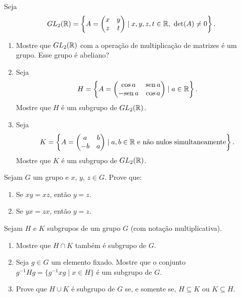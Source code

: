 \documentclass[12pt]{article}
\begin{document}
\questao{} Seja
\[
	GL_2(\mathbb{R}) = \left\{A = \begin{pmatrix}
		x & y\\z & t
	\end{pmatrix} \mid x, y, z, t \in \mathbb{R},\ \det(A) \ne 0\right\}.
\]
\begin{enumerate}[label=({\alph*})]
	\item Mostre que $GL_2(\mathbb{R})$ com a opera\c{c}\~ao de multiplica\c{c}\~ao de matrizes \'e um grupo. Esse grupo \'e abeliano?
	\item Seja
	\[
		H = \left\{ A = \begin{pmatrix}
			\cos a & {\rm sen\,} a\\ -{\rm sen\,} a & \cos a
		\end{pmatrix} \mid a \in \mathbb{R}\right\}.
	\]
	Mostre que $H$ \'e um subgrupo de $GL_2(\mathbb{R})$.
	\item Seja
	\[
		K = \left\{ A = \begin{pmatrix}
			a & b\\ -b & a
		\end{pmatrix} \mid a, b \in \mathbb{R} \mbox{ e n\~ao nulos simultaneamente}\right\}.
	\]
	Mostre que $K$ \'e um subgrupo de $GL_2(\mathbb{R})$.
\end{enumerate}

\vesp

\questao{} Sejam $G$ um grupo e $x$, $y$, $z \in G$. Prove que:
\begin{enumerate}[label=({\alph*})]
	\item Se $xy = xz$, ent\~ao $y = z$.
	\item Se $yx = zx$, ent\~ao $y = z$.
\end{enumerate}

\vesp

\questao{} Sejam $H$ e $K$ subgrupos de um grupo $G$ (com nota{\c c}{\~a}o
multiplicativa).
\begin{enumerate}[label=({\alph*})]
\item Mostre que $H\cap K$ tamb{\'e}m {\'e} subgrupo de $G$.
\item Seja $g\in G$ um elemento fixado. Mostre que o conjunto
$g^{-1}Hg=\{ g^{-1}xg \mid x\in H \} $ {\'e} um subgrupo de $G$.
\item Prove que $H\cup K$ {\'e} subgrupo de $G$ se, e somente se,
$H\subseteq K$ ou $K\subseteq H$.

\end{enumerate}
\end{document}

